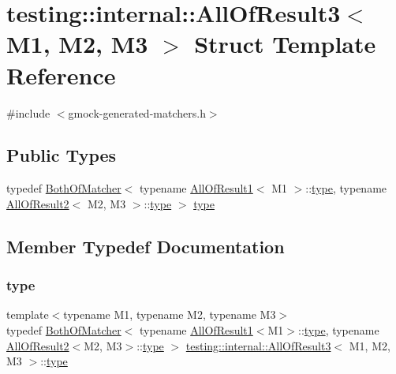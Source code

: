 \hypertarget{structtesting_1_1internal_1_1_all_of_result3}{}\section{testing\+:\+:internal\+:\+:All\+Of\+Result3$<$ M1, M2, M3 $>$ Struct Template Reference}
\label{structtesting_1_1internal_1_1_all_of_result3}


{\ttfamily \#include $<$gmock-\/generated-\/matchers.\+h$>$}

\subsection*{Public Types}
\begin{DoxyCompactItemize}
\item 
typedef \hyperlink{classtesting_1_1internal_1_1_both_of_matcher}{Both\+Of\+Matcher}$<$ typename \hyperlink{structtesting_1_1internal_1_1_all_of_result1}{All\+Of\+Result1}$<$ M1 $>$\+::\hyperlink{structtesting_1_1internal_1_1_all_of_result3_a18073a23acd542bccf3a6c5d7f72f957}{type}, typename \hyperlink{structtesting_1_1internal_1_1_all_of_result2}{All\+Of\+Result2}$<$ M2, M3 $>$\+::\hyperlink{structtesting_1_1internal_1_1_all_of_result3_a18073a23acd542bccf3a6c5d7f72f957}{type} $>$ \hyperlink{structtesting_1_1internal_1_1_all_of_result3_a18073a23acd542bccf3a6c5d7f72f957}{type}
\end{DoxyCompactItemize}


\subsection{Member Typedef Documentation}
\mbox{\label{structtesting_1_1internal_1_1_all_of_result3_a18073a23acd542bccf3a6c5d7f72f957}} 
\subsubsection{\texorpdfstring{type}{type}}
{\footnotesize\ttfamily template$<$typename M1, typename M2, typename M3$>$ \\
typedef \hyperlink{classtesting_1_1internal_1_1_both_of_matcher}{Both\+Of\+Matcher}$<$ typename \hyperlink{structtesting_1_1internal_1_1_all_of_result1}{All\+Of\+Result1}$<$M1$>$\+::\hyperlink{structtesting_1_1internal_1_1_all_of_result3_a18073a23acd542bccf3a6c5d7f72f957}{type}, typename \hyperlink{structtesting_1_1internal_1_1_all_of_result2}{All\+Of\+Result2}$<$M2, M3$>$\+::\hyperlink{structtesting_1_1internal_1_1_all_of_result3_a18073a23acd542bccf3a6c5d7f72f957}{type} $>$ \hyperlink{structtesting_1_1internal_1_1_all_of_result3}{testing\+::internal\+::\+All\+Of\+Result3}$<$ M1, M2, M3 $>$\+::\hyperlink{structtesting_1_1internal_1_1_all_of_result3_a18073a23acd542bccf3a6c5d7f72f957}{type}}



